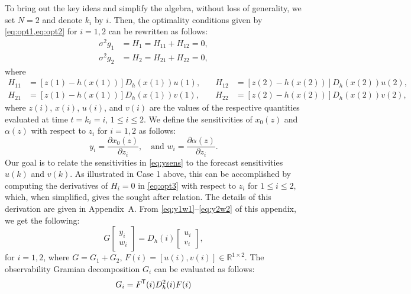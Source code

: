 \documentclass{article}
\newcommand*{\tran}{^{\mkern-1.5mu\mathsf{T}}}
\begin{document}
To bring out the key ideas and simplify the algebra, without loss of generality, we set $N=2$ and denote $k_i$ by $i$. Then, the optimality conditions given by \cref{eq:opt1,eq:opt2} for $i = 1,2$ can be rewritten as follows:
\begin{equation}
    \begin{aligned}
        \sigma^2 g_1 &= H_1 = H_{11} + H_{12} = 0,\\
        \sigma^2 g_2 &= H_2 = H_{21} + H_{22} = 0, 
    \end{aligned} \label{eq:opt3}
\end{equation}
where
\begin{align}
        H_{11} &= [z(1) - h(x(1))]D_h(x(1)) u(1), &\quad  H_{12} &= [z(2) - h(x(2))]D_h(x(2)) u(2), \label{eq:H1j} \\
        H_{21} &= [z(1) - h(x(1))]D_h(x(1)) v(1), &\quad  H_{22} &= [z(2) - h(x(2))]D_h(x(2)) v(2), \label{eq:H2j}
\end{align}
where $z(i)$, $x(i)$, $u(i)$, and $v(i)$ are the values of the respective quantities evaluated at time $t= k_i = i$, $1\le i\le 2$. We define the sensitivities of $x_0(z)$ and $\alpha(z)$ with respect to $z_i$ for $i = 1,2$ as follows:
\begin{equation}
    y_i = \dfrac{\partial x_0(z)}{\partial z_i}, \quad \text{and } w_i = \dfrac{\partial \alpha(z)}{\partial z_i}. \label{eq:ysens}
\end{equation}
Our goal is to relate the sensitivities in \cref{eq:ysens} to the forecast sensitivities $u(k)$ and $v(k)$. As illustrated in Case 1 above, this can be accomplished by computing the derivatives of $H_i=0$ in \cref{eq:opt3} with respect to $z_i$ for $1 \le i \le 2$, which, when simplified, gives the sought after relation. The details of this derivation are given in Appendix~A. From \cref{eq:y1w1}--\cref{eq:y2w2} of this appendix, we get the following:
\begin{equation}
    G \begin{bmatrix}y_i \\ w_i \end{bmatrix} = D_h(i) \begin{bmatrix}u_i \\ v_i \end{bmatrix},
\end{equation}
for $i = 1, 2$, where $G=G_1+G_2$, $F(i) = [u(i),v(i)] \in \mathbb{R}^{1\times 2}$. The observability Gramian decomposition $G_i$ can be evaluated as follows:
\begin{equation}
    G_i = F\tran(i) D_h^2(i) F(i)
\end{equation}
\end{document}

